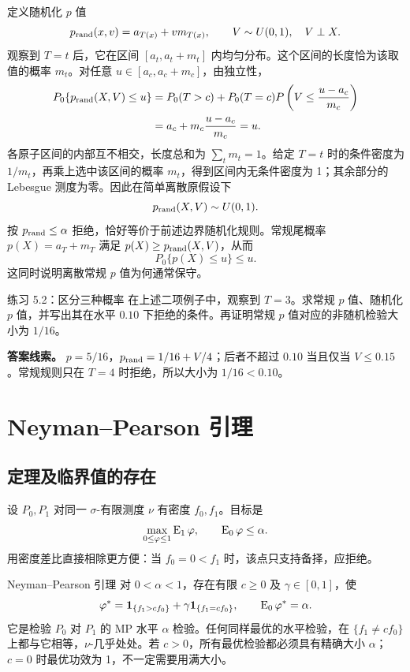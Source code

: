 定义随机化 $p$ 值
\[
 p_{\rm rand}(x,v)=a_{T(x)}+v m_{T(x)},\qquad
 V\sim U(0,1),\quad V\perp X.
\]
观察到 $T=t$ 后，它在区间 $[a_t,a_t+m_t]$ 内均匀分布。这个区间的长度恰为该取值的概率 $m_t$。对任意
$u\in[a_c,a_c+m_c]$，由独立性，
\begin{align*}
 P_0\{p_{\rm rand}(X,V)\le u\}
 &=P_0(T>c)+P_0(T=c)
       P\left(V\le\frac{u-a_c}{m_c}\right)\\
 &=a_c+m_c\frac{u-a_c}{m_c}=u.
\end{align*}
各原子区间的内部互不相交，长度总和为 $\sum_t m_t=1$。给定 $T=t$ 时的条件密度为 $1/m_t$，再乘上选中该区间的概率 $m_t$，得到区间内无条件密度为 1；其余部分的 Lebesgue 测度为零。因此在简单离散原假设下
\[
 p_{\rm rand}(X,V)\sim U(0,1).
\]
按 $p_{\rm rand}\le\alpha$ 拒绝，恰好等价于前述边界随机化规则。常规尾概率 $p(X)=a_T+m_T$ 满足 $p(X)\ge p_{\rm rand}(X,V)$，从而
\[
 P_0\{p(X)\le u\}\le u.
\]
这同时说明离散常规 $p$ 值为何通常保守。

\begin{examplebox}{练习 5.2：区分三种概率}
在上述二项例子中，观察到 $T=3$。求常规 $p$ 值、随机化 $p$ 值，并写出其在水平 $0.10$ 下拒绝的条件。再证明常规 $p$ 值对应的非随机检验大小为 $1/16$。

\textbf{答案线索。} $p=5/16$，$p_{\rm rand}=1/16+V/4$；后者不超过 $0.10$ 当且仅当 $V\le0.15$。常规规则只在 $T=4$ 时拒绝，所以大小为 $1/16<0.10$。
\end{examplebox}

\section{Neyman--Pearson 引理}

\subsection{定理及临界值的存在}

设 $P_0,P_1$ 对同一 $\sigma$-有限测度 $\nu$ 有密度 $f_0,f_1$。目标是
\[
 \max_{0\le\varphi\le1}\operatorname{E}_1\varphi,
 \qquad \operatorname{E}_0\varphi\le\alpha.
\]
用密度差比直接相除更方便：当 $f_0=0<f_1$ 时，该点只支持备择，应拒绝。

\begin{definitionbox}{Neyman--Pearson 引理}
对 $0<\alpha<1$，存在有限 $c\ge0$ 及 $\gamma\in[0,1]$，使
\[
 \varphi^*=\mathbf 1_{\{f_1>cf_0\}}
              +\gamma\mathbf 1_{\{f_1=cf_0\}},
 \qquad \operatorname{E}_0\varphi^*=\alpha.
\]
它是检验 $P_0$ 对 $P_1$ 的 MP 水平 $\alpha$ 检验。任何同样最优的水平检验，在 $\{f_1\ne cf_0\}$ 上都与它相等，$\nu$-几乎处处。若 $c>0$，所有最优检验都必须具有精确大小 $\alpha$；$c=0$ 时最优功效为 1，不一定需要用满大小。
\end{definitionbox}

